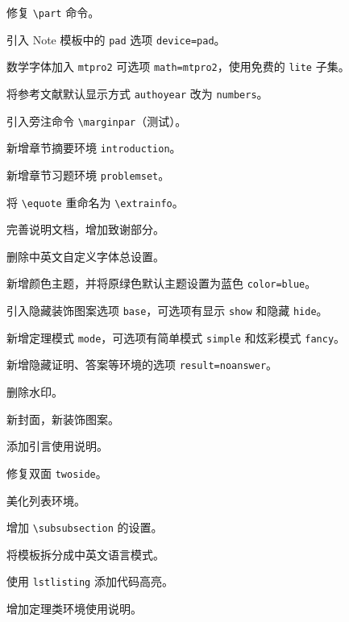 \documentclass[lang=cn,newtx,10pt,scheme=chinese,pad,twocol]{zznote}
\begin{document}
\begin{change}
	\item 修复 \lstinline{\part} 命令。
	\item 引入 Note 模板中的 \lstinline{pad} 选项 \lstinline{device=pad}。
	\item 数学字体加入 \lstinline{mtpro2} 可选项 \lstinline{math=mtpro2}，使用免费的 \lstinline{lite} 子集。
	\item 将参考文献默认显示方式 \lstinline{authoyear} 改为 \lstinline{numbers}。
	\item 引入旁注命令 \lstinline{\marginpar}（测试）。
	\item 新增章节摘要环境 \lstinline{introduction}。
	\item 新增章节习题环境 \lstinline{problemset}。
	\item 将 \lstinline{\equote} 重命名为 \lstinline{\extrainfo}。
	\item 完善说明文档，增加致谢部分。
\end{change}


\begin{change}
	\item 删除中英文自定义字体总设置。
	\item 新增颜色主题，并将原绿色默认主题设置为蓝色 \lstinline{color=blue}。
	\item 引入隐藏装饰图案选项 \lstinline{base}，可选项有显示 \lstinline{show} 和隐藏 \lstinline{hide}。
	\item 新增定理模式 \lstinline{mode}，可选项有简单模式 \lstinline{simple} 和炫彩模式 \lstinline{fancy}。
	\item 新增隐藏证明、答案等环境的选项 \lstinline{result=noanswer}。
\end{change}


\begin{change}
	\item 删除水印。
	\item 新封面，新装饰图案。
	\item 添加引言使用说明。
	\item 修复双面 \lstinline{twoside}。
	\item 美化列表环境。
	\item 增加 \lstinline{\subsubsection} 的设置。
	\item 将模板拆分成中英文语言模式。
	\item 使用 \lstinline{lstlisting} 添加代码高亮。
	\item 增加定理类环境使用说明。
\end{change}
\end{document}
